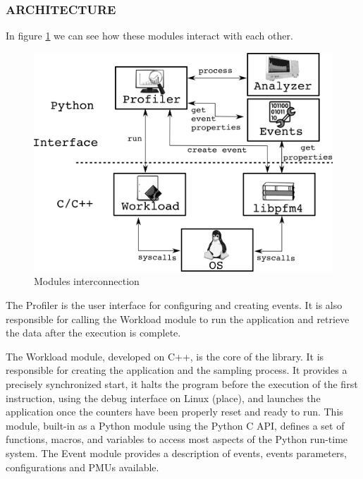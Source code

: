 
\subsubsection{ARCHITECTURE}

In figure \ref{fig:achitecture} we can see how these modules interact with each other.
\begin{figure}[H]
    \centering
    \includegraphics[width=\textwidth]{fingerprint/figures/architecture.png}
    \caption{Modules interconnection}
    \label{fig:achitecture}
\end{figure}

The Profiler is the user interface for configuring and creating events.
It is also responsible for calling the Workload module to run the application and retrieve the data after the execution is complete.

The Workload module, developed on C++, is the core of the library.
It is responsible for creating the application and the sampling process.
It provides a precisely synchronized start, it halts the program before the execution of the first instruction, using the debug interface on Linux (place), and launches the application once the counters have been properly reset and ready to run.
This module, built-in as a Python module using the Python C API, defines a set of functions, macros, and variables to access most aspects of the Python run-time system.
The Event module provides a description of events, events parameters, configurations and PMUs available.

